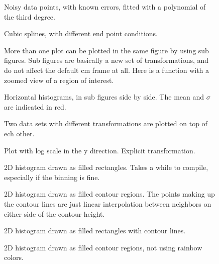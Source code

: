 \documentclass{article}
\begin{document}
\begin{figure}[H]
\centering

\caption{Noisy data points, with known errors, fitted with a polynomial of the third degree.}
\end{figure}
\begin{figure}[H]
\centering

\caption{Cubic splines, with different end point conditions.}
\end{figure}
\begin{figure}[H]
\centering

\caption{More than one plot can be plotted in the same figure by using sub figures.
Sub figures are basically a new set of transformations, and do not affect the default cm frame at all.
Here is a function with a zoomed view of a region of interest.}
\end{figure}
\begin{figure}[H]
\centering

\caption{Horizontal histograms, in sub figures side by side. The mean and $\sigma$ are indicated in red.}
\end{figure}
\begin{figure}[H]
\centering

\caption{Two data sets with different transformations are plotted on top of ech other.}
\end{figure}
\begin{figure}[H]
\centering

\caption{Plot with log scale in the y direction. Explicit transformation.}
\end{figure}
\begin{figure}[H]
\centering

\caption{2D histogram drawn as filled rectangles. Takes a while to compile, 
especially if the binning is fine.}
\end{figure}
\begin{figure}[H]
\centering

\caption{2D histogram drawn as filled contour regions. The points making up the contour lines 
are just linear interpolation between neighbors on either side of the contour height.}
\end{figure}
\begin{figure}[H]
\centering

\caption{2D histogram drawn as filled rectangles with contour lines.}
\end{figure}
\begin{figure}[H]
\centering

\caption{2D histogram drawn as filled contour regions, not using rainbow colors.}
\end{figure}
\end{document}
